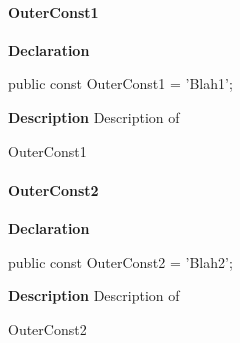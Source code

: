 \documentclass{report}
\begin{document}
\paragraph*{OuterConst1}\hspace*{\fill}

\begin{list}{}{
\setlength{\itemindent}{0cm}
\setlength{\listparindent}{0cm}
\setlength{\leftmargin}{\evensidemargin}
\addtolength{\leftmargin}{\tmplength}
\settowidth{\labelsep}{X}
\addtolength{\leftmargin}{\labelsep}
\setlength{\labelwidth}{\tmplength}
}
\begin{flushleft}
\item[\textbf{Declaration}\hfill]
\begin{ttfamily}
public const OuterConst1 = 'Blah1';\end{ttfamily}


\end{flushleft}
\par
\item[\textbf{Description}]
Description of \begin{ttfamily}OuterConst1\end{ttfamily}

\end{list}
\paragraph*{OuterConst2}\hspace*{\fill}

\begin{list}{}{
\setlength{\itemindent}{0cm}
\setlength{\listparindent}{0cm}
\setlength{\leftmargin}{\evensidemargin}
\addtolength{\leftmargin}{\tmplength}
\settowidth{\labelsep}{X}
\addtolength{\leftmargin}{\labelsep}
\setlength{\labelwidth}{\tmplength}
}
\begin{flushleft}
\item[\textbf{Declaration}\hfill]
\begin{ttfamily}
public const OuterConst2 = 'Blah2';\end{ttfamily}


\end{flushleft}
\par
\item[\textbf{Description}]
Description of \begin{ttfamily}OuterConst2\end{ttfamily}

\end{list}
\end{document}
